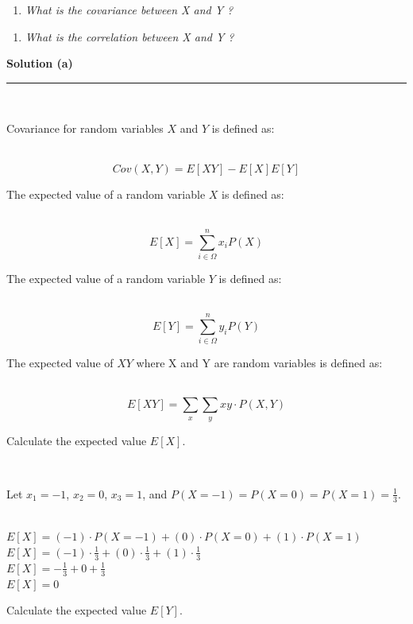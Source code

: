 \documentclass{article}
\begin{document}
\begin{enumerate}[label=(a)]
  \item \textit{What is the covariance between X and Y ?}
\end{enumerate}

\begin{enumerate}[label=(b)]
  \item \textit{What is the correlation between X and Y ?}
\end{enumerate}

\textbf{Solution (a)}

\noindent\rule{\textwidth}{0.4pt}\\

\parbox{\textwidth}{Covariance for random variables $X$ and $Y$ is defined as:}\\

$$Cov(X,Y) = E[XY] - E[X]E[Y]$$

\parbox{\textwidth}{The expected value of a random variable $X$ is defined as:}\\

$$E[X] = \sum^{n}_{i\in \Omega} x_i P(X)$$

\parbox{\textwidth}{The expected value of a random variable $Y$ is defined as:}\\

$$E[Y] = \sum^{n}_{i\in \Omega} y_i P(Y)$$


\parbox{\textwidth}{The expected value of $XY$  where X and Y are random variables is defined as:}\\

$$E[XY] = \sum_{x} \sum_{y} xy \cdot P(X,Y)$$

\parbox{\textwidth}{Calculate the expected value $E[X]$.}\\

\parbox{\textwidth}{Let $x_1 = -1$, $x_2 = 0$, $x_3 = 1$, and $P(X=-1) = P(X=0) = P(X=1) = \frac{1}{3}$.}\\

$E[X] = (-1) \cdot P(X = -1) + (0) \cdot P(X = 0) + (1) \cdot P(X = 1)$\\

$E[X] = (-1) \cdot \frac{1}{3} + (0) \cdot \frac{1}{3} + (1) \cdot \frac{1}{3}$\\

$E[X] = -\frac{1}{3} + 0 + \frac{1}{3}$\\

$E[X] = 0$\\

\parbox{\textwidth}{Calculate the expected value $E[Y]$.}\\
\end{document}
